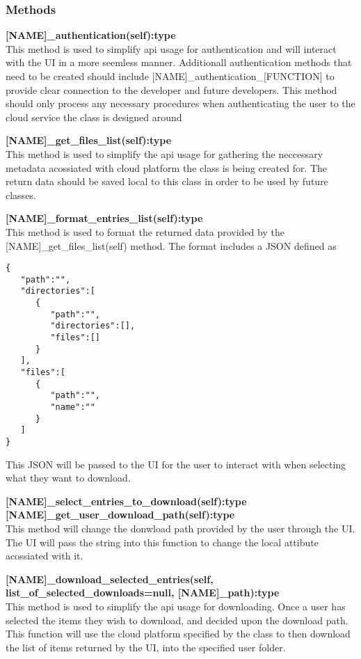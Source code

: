 \subsubsection{Methods}
\textbf{[NAME]\_authentication(self):type} \\
This method is used to simplify api usage for authentication and will interact with the UI in a more seemless manner. Additionall authentication
methods that need to be created should include [NAME]\_authentication\_[FUNCTION] to provide clear connection to the developer and future 
developers. This method should only process any necessary procedures when authenticating the user to the cloud service the class is designed around

\textbf{[NAME]\_get\_files\_list(self):type} \\
This method is used to simplify the api usage for gathering the neccessary metadata acossiated with cloud platform the class is being created for.
The return data should be saved local to this class in order to be used by future classes. 

\textbf{[NAME]\_format\_entries\_list(self):type} \\
This method is used to format the returned data provided by the [NAME]\_get\_files\_list(self) method. The format includes a JSON defined as 
\begin{verbatim}
{
   "path":"",
   "directories":[
      {
         "path":"",
         "directories":[],
         "files":[]
      }
   ],
   "files":[
      {
         "path":"",
         "name":""
      }
   ]
}
\end{verbatim}
This JSON will be passed to the UI for the user to interact with when selecting what they want to download.

\textbf{[NAME]\_select\_entries\_to\_download(self):type} \\

\textbf{[NAME]\_get\_user\_download\_path(self):type} \\
This method will change the donwload path provided by the user through the UI. The UI will pass the string into this function to change the
local attibute acossiated with it.

\textbf{[NAME]\_download\_selected\_entries(self, list\_of\_selected\_downloads=null, [NAME]\_path):type} \\
This method is used to simplify the api usage for downloading. Once a user has selected the items they wish to download, and decided upon the 
download path. This function will use the cloud platform specified by the class to then download the list of items returned by the UI, into the 
specified user folder.

